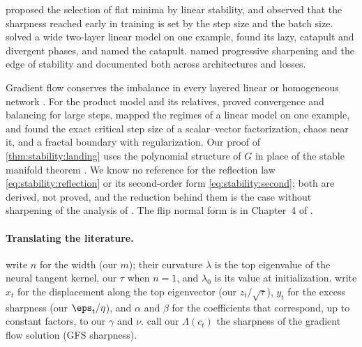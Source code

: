 \begin{refsection}
\notesandrefs
\Textcite{WuMaE2018} proposed the selection of flat minima by linear stability, and \textcite{JastrzebskiEtAl2019,JastrzebskiEtAl2020} observed that the sharpness reached early in training is set by the step size and the batch size. \Textcite{LewkowyczEtAl2020} solved a wide two-layer linear model on one example, found its lazy, catapult and divergent phases, and named the catapult. \Textcite{CohenEtAl2021} named progressive sharpening and the edge of stability and documented both across architectures and losses.

Gradient flow conserves the imbalance in every layered linear or homogeneous network \parencite{DuHuLee2018}. For the product model and its relatives, \textcite{WangEtAl2022} proved convergence and balancing for large steps, \textcite{KalraHeBarkeshli2025} mapped the regimes of a linear model on one example, and \textcite{LiangMontufar2026} found the exact critical step size of a scalar--vector factorization, chaos near it, and a fractal boundary with regularization. Our proof of \cref{thm:stability:landing} uses the polynomial structure of $G$ in place of the stable manifold theorem \parencite{LeeEtAl2016,LeeEtAl2019}. We know no reference for the reflection law \eqref{eq:stability:reflection} or its second-order form \eqref{eq:stability:second}; both are derived, not proved, and the reduction behind them is the case without sharpening of the analysis of \textcite{DamianNichaniLee2023}. The flip normal form is in Chapter~4 of \textcite{Kuznetsov2004}.

\paragraph{Translating the literature.} \Textcite{LewkowyczEtAl2020} write $n$ for the width (our $m$); their curvature $\lambda$ is the top eigenvalue of the neural tangent kernel, our $\tau$ when $n=1$, and $\lambda_0$ is its value at initialization. \Textcite{DamianNichaniLee2023} write $x_t$ for the displacement along the top eigenvector (our $z_t/\sqrt\tau$), $y_t$ for the excess sharpness (our $\eps_t/\eta$), and $\alpha$ and $\beta$ for the coefficients that correspond, up to constant factors, to our $\gamma$ and $\nu$. \Textcite{KreislerEtAl2023} call our $\Lambda(c_t)$ the sharpness of the gradient flow solution (GFS sharpness).

\printchapterbib
\end{refsection}
